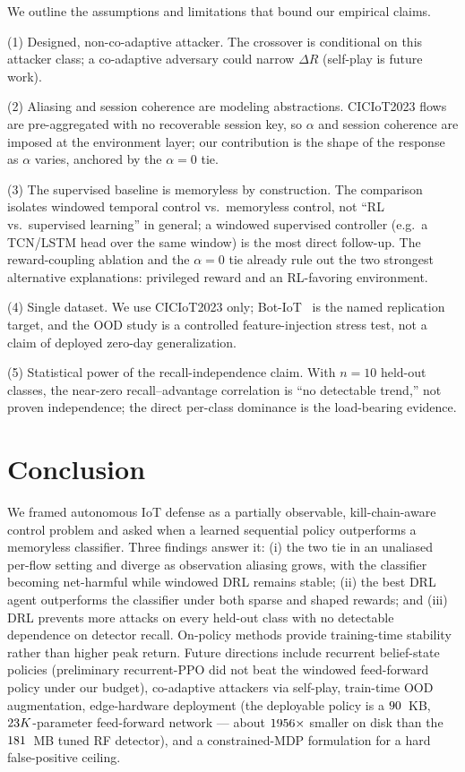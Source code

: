 \documentclass[3p,twocolumn]{elsarticle}
\begin{document}
We outline the assumptions and limitations that bound our empirical claims.

(1) Designed, non-co-adaptive attacker. The crossover is conditional on
this attacker class; a co-adaptive adversary could narrow $\Delta R$ (self-play
is future work).

(2) Aliasing and session coherence are modeling abstractions.
CICIoT2023 flows are pre-aggregated with no recoverable session key, so $\alpha$
and session coherence are imposed at the environment layer; our contribution is
the shape of the response as $\alpha$ varies, anchored by the $\alpha=0$ tie.

(3) The supervised baseline is memoryless by construction. The
comparison isolates windowed temporal control vs.\ memoryless control, not
``RL vs.\ supervised learning'' in general; a windowed supervised controller
(e.g.\ a TCN/LSTM head over the same window) is the most direct follow-up. The
reward-coupling ablation and the $\alpha=0$ tie already rule out the two
strongest alternative explanations: privileged reward and an RL-favoring
environment.

(4) Single dataset. We use CICIoT2023 only; Bot-IoT~\cite{Koroniotis2019}
is the named replication target, and the OOD study is a controlled
feature-injection stress test, not a claim of deployed zero-day generalization.

(5) Statistical power of the recall-independence claim. With $n=10$
held-out classes, the near-zero recall--advantage correlation is
``no detectable trend,'' not proven independence; the direct per-class
dominance is the load-bearing evidence.

\section{Conclusion}
\label{sec:conclusion}

We framed autonomous IoT defense as a partially observable, kill-chain-aware
control problem and asked when a learned sequential policy outperforms a
memoryless classifier. Three findings answer it: (i) the two tie in an unaliased
per-flow setting and diverge as observation aliasing grows, with the classifier
becoming net-harmful while windowed DRL remains stable; (ii) the best DRL agent
outperforms the classifier under both sparse and shaped rewards; and (iii) DRL
prevents more attacks on every held-out class with no detectable dependence on
detector recall. On-policy methods provide training-time stability rather than higher peak
return. Future directions include recurrent belief-state policies (preliminary
recurrent-PPO did not beat the windowed feed-forward policy under our budget),
co-adaptive attackers via self-play, train-time OOD augmentation, edge-hardware
deployment (the deployable policy is a $90$~KB, $23K$-parameter
feed-forward network --- about $1956\times$ smaller on disk than the
$181$~MB tuned RF detector), and a constrained-MDP formulation
for a hard false-positive ceiling.
\end{document}
